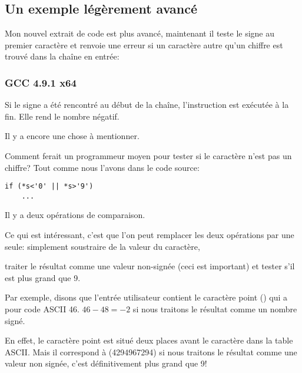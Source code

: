 

\subsection{Un exemple légèrement avancé}

Mon nouvel extrait de code est plus avancé, maintenant il teste le signe 
au premier caractère et renvoie une erreur si un caractère autre qu'un chiffre est
trouvé dans la chaîne en entrée:



\subsubsection{GCC 4.9.1 x64 \Optimizing}




Si le signe  a été rencontré au début de la chaîne, l'instruction 
est exécutée à la fin.
Elle rend le nombre négatif.

\label{one_comparison_instead_of_two}
Il y a encore une chose à mentionner.

Comment ferait un programmeur moyen pour tester si le caractère n'est pas un chiffre?
Tout comme nous l'avons dans le code source:

\begin{lstlisting}[style=customc]
if (*s<'0' || *s>'9')
    ...
\end{lstlisting}

Il y a deux opérations de comparaison.

Ce qui est intéressant, c'est que l'on peut remplacer les deux opérations par une
seule:
simplement soustraire  de la valeur du caractère,

traiter le résultat comme une valeur non-signée (ceci est important) et tester s'il
est plus grand que 9.

Par exemple, disons que l'entrée utilisateur contient le caractère point ()
qui a pour code \ac{ASCII} 46.
$46-48=-2$ si nous traitons le résultat comme un nombre signé.

En effet, le caractère point est situé deux places avant le caractère  dans la table \ac{ASCII}.
Mais il correspond à  (4294967294)
si nous traitons le résultat comme une valeur non signée, c'est définitivement plus
grand que 9!

